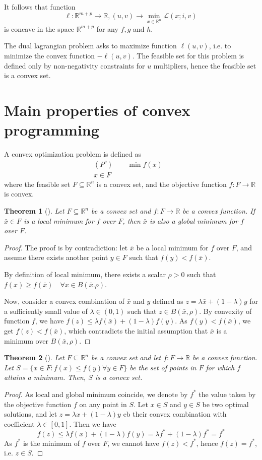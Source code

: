 \documentclass{book}
\newcommand{\R}{\mathbb{R}}
\theoremstyle{theoremv2}
\newtheorem{theorem}{Theorem}[chapter]
\theoremstyle{defv2}
\theoremstyle{remark}
\theoremstyle{remark}
\begin{document}
It follows that function 
\[
    \ell:\R^{m+p}\to\R, (u,v)\to\min_{x\in\R^n}\mathcal{L}(x;i,v)
\]
is concave in the space $\R^{m+p}$ for any $f,g$ and $h$.

The dual lagrangian problem asks to maximize function $\ell(u,v)$, i.e. to minimize the convex function $-\ell(u,v)$. The feasible set for this problem is defined only by non-negativity constraints for $u$ multipliers, hence the feasible set is a convex set.
\section{Main properties of convex programming}
A convex optimization problem is defined as 
\begin{align*}
    (P^c) \qquad \min f(x)&\\
    x\in F&
\end{align*}
where the feasible set $F\subseteq\R^n$ is a convex set, and the objective function $f:F\to\R$ is convex.
\begin{theorem}[]
    Let $F\subseteq\R^n$ be a convex set and $f:F\to\R$ be a convex function. If $\bar{x}\in F$ is a local minimum for $f$ over $F$, then $\bar{x}$ is also a global minimum for $f$ over $F$.
\end{theorem}
\begin{proof}
    The proof is by contradiction: let $\bar{x}$ be a local minimum for $f$ over $F$, and assume there exists another point $y\in F$ such that $f(y)<f(\bar{x})$.

    By definition of local minimum, there exists a scalar $\rho>0$ such that $f(x)\geq f(\bar{x})\quad \forall x\in B(\bar{x}.\rho)$. 

    Now, consider a convex combination of $\bar{x}$ and $y$ defined as $z=\lambda\bar{x}+(1-\lambda)y$ for a sufficiently small value of $\lambda\in(0,1)$ such that $z\in B(\bar{x},\rho)$. By convexity of function $f$, we have $f(z)\leq \lambda f(\bar{x}) + (1-\lambda)f(y)$. As $f(y)<f(\bar{x})$, we get $f(z)<f(\bar{x})$, which contradicts the initial assumption that $\bar{x}$ is a minimum over $B(\bar{x},\rho)$.
\end{proof}
\begin{theorem}[]
    Let $F\subseteq\R^n$ be a convex set and let $f:F\to\R$ be a convex function. Let $S=\{ x\in F:f(x)\leq f(y) \forall y\in F \}$ be the set of points in $F$ for which $f$ attains a minimum. Then, $S$ is a convex set.
\end{theorem}
\begin{proof}
    As local and global minimum coincide, we denote by $f^*$ the value taken by the objective function $f$ on any point in $S$. Let $x\in S$ and $y\in S$ be two optimal solutions, and let $z=\lambda x + (1-\lambda)y$ eb their convex combination with coefficient $\lambda\in[0,1]$. Then we have 
    \[
        f(z)\leq\lambda f(x)+(1-\lambda)f(y) = \lambda f^* + (1-\lambda)f^* = f^* 
    \]
    As $f^*$ is the minimum of $f$ over $F$, we cannot have $f(z)<f^*$, hence $f(z)=f^*$, i.e. $z\in S$.
\end{proof}
\end{document}
